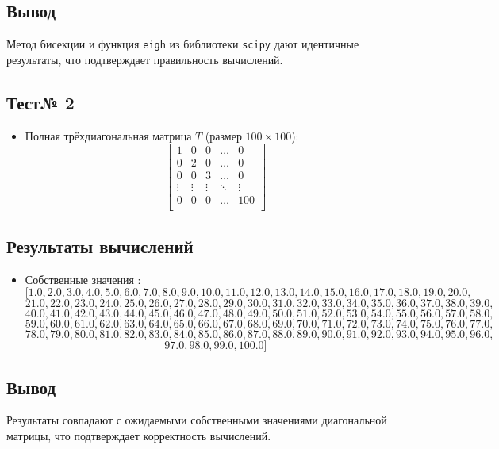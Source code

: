 \documentclass{article}
\begin{document}
\subsection*{Вывод}
Метод бисекции и функция \texttt{eigh} из библиотеки \texttt{scipy} дают идентичные результаты, что подтверждает правильность вычислений.


\subsection*{Тест№ 2}
\begin{itemize}
    \item Полная трёхдиагональная матрица $T$ (размер $100 \times 100$):
    \[
    \begin{bmatrix}
    1 & 0 & 0 & \ldots & 0 \\
    0 & 2 & 0 & \ldots & 0 \\
    0 & 0 & 3 & \ldots & 0 \\
    \vdots & \vdots & \vdots & \ddots & \vdots \\
    0 & 0 & 0 & \ldots & 100 \\
    \end{bmatrix}
    \]
    
\end{itemize}

\subsection*{Результаты вычислений}
\begin{itemize}
    \item Собственные значения :
    \[
    [1.0, 2.0, 3.0, 4.0, 5.0, 6.0, 7.0, 8.0, 9.0, 10.0, 11.0, 12.0, 13.0, 14.0, 15.0, 16.0, 17.0, 18.0, 19.0, 20.0,
    \]
    \[
    21.0, 22.0, 23.0, 24.0, 25.0, 26.0, 27.0, 28.0, 29.0, 30.0, 31.0, 32.0, 33.0, 34.0, 35.0, 36.0, 37.0, 38.0, 39.0,
    \]
    \[
    40.0, 41.0, 42.0, 43.0, 44.0, 45.0, 46.0, 47.0, 48.0, 49.0, 50.0, 51.0, 52.0, 53.0, 54.0, 55.0, 56.0, 57.0, 58.0,
    \]
    \[
    59.0, 60.0, 61.0, 62.0, 63.0, 64.0, 65.0, 66.0, 67.0, 68.0, 69.0, 70.0, 71.0, 72.0, 73.0, 74.0, 75.0, 76.0, 77.0,
    \]
    \[
    78.0, 79.0, 80.0, 81.0, 82.0, 83.0, 84.0, 85.0, 86.0, 87.0, 88.0, 89.0, 90.0, 91.0, 92.0, 93.0, 94.0, 95.0, 96.0,
    \]
    \[
    97.0, 98.0, 99.0, 100.0]
    \]
\end{itemize}



\subsection*{Вывод}
Результаты совпадают с ожидаемыми собственными значениями диагональной матрицы, что подтверждает корректность вычислений.
\end{document}
